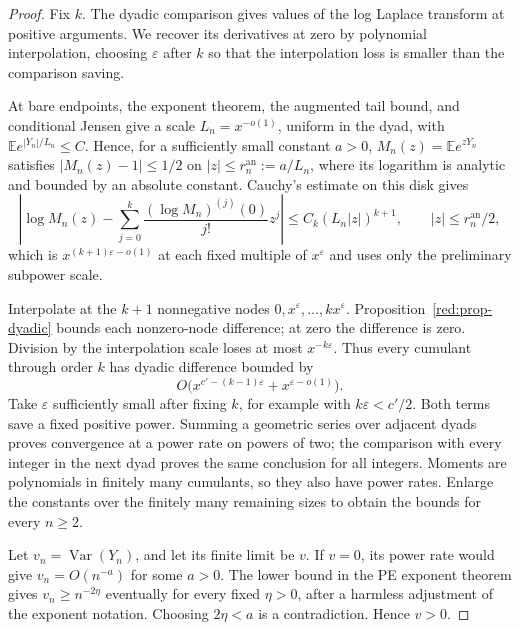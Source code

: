 \begin{proof}
Fix \(k\). The dyadic comparison gives values of the log Laplace
transform at positive arguments. We recover its derivatives at zero
by polynomial interpolation, choosing \(\varepsilon\) after \(k\)
so that the interpolation loss is smaller than the comparison saving.

At bare endpoints, the exponent theorem, the augmented tail bound,
and conditional Jensen give a scale \(L_n=x^{-o(1)}\), uniform in
the dyad, with \(\mathbb E e^{|Y_n|/L_n}\le C\). Hence, for a
sufficiently small constant \(a>0\),
\(M_n(z)=\mathbb E e^{zY_n}\) satisfies
\(|M_n(z)-1|\le1/2\) on
\(|z|\le r_n^{\mathrm{an}}:=a/L_n\), where its logarithm is analytic
and bounded by an absolute constant.
Cauchy's estimate on this disk gives
\[
 \left|\log M_n(z)-
   \sum_{j=0}^{k}\frac{(\log M_n)^{(j)}(0)}{j!}z^j\right|
 \le C_k(L_n|z|)^{k+1},
 \qquad |z|\le r_n^{\mathrm{an}}/2,
\]
which is \(x^{(k+1)\varepsilon-o(1)}\) at each fixed multiple of \(x^\varepsilon\) and uses
only the preliminary subpower scale.

Interpolate at the \(k+1\) nonnegative nodes
\(0,x^\varepsilon,\ldots,kx^\varepsilon\).
Proposition~\ref{red:prop-dyadic} bounds each nonzero-node difference;
at zero the difference is zero. Division by the interpolation scale
loses at most \(x^{-k\varepsilon}\). Thus every cumulant through
order \(k\) has dyadic difference bounded by
\[
 O\bigl(x^{c'-(k-1)\varepsilon}
              +x^{\varepsilon-o(1)}\bigr).
\]
Take \(\varepsilon\) sufficiently small after fixing \(k\), for
example with \(k\varepsilon<c'/2\). Both terms save a fixed positive
power. Summing a geometric series over adjacent dyads proves
convergence at a power rate on powers of two; the comparison with
every integer in the next dyad proves the same conclusion for all
integers. Moments are polynomials in finitely many cumulants, so they
also have power rates. Enlarge the constants over the finitely many
remaining sizes to obtain the bounds for every \(n\ge2\).

Let \(v_n=\operatorname{Var}(Y_n)\), and let its finite limit be
\(v\). If \(v=0\), its power rate would give
\(v_n=O(n^{-a})\) for some \(a>0\). The lower bound in the PE
exponent theorem gives \(v_n\ge n^{-2\eta}\) eventually for every
fixed \(\eta>0\), after a harmless adjustment of the exponent
notation. Choosing \(2\eta<a\) is a contradiction. Hence \(v>0\).


\end{proof}
